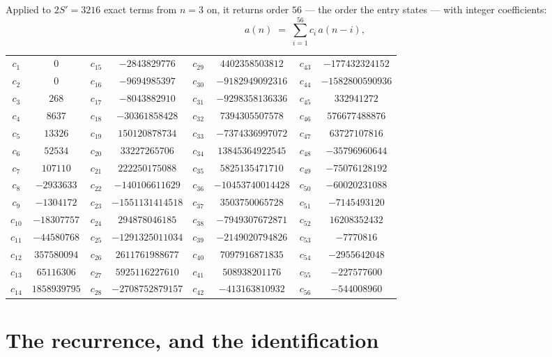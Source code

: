 \documentclass[11pt,a4paper]{article}
\theoremstyle{plain}
\theoremstyle{definition}
\begin{document}
Applied to $2S'=3216$ exact terms from $n=3$ on, it returns order $56$ --- the
order the entry states --- with integer coefficients:
\[
a(n)\;=\;\sum_{i=1}^{56}c_i\,a(n-i),
\]
\begin{center}\small
\begin{tabular}{cccccccc}
$c_{1}$ & $0$ & $c_{15}$ & $-2843829776$ & $c_{29}$ & $4402358503812$ & $c_{43}$ & $-177432324152$ \\
$c_{2}$ & $0$ & $c_{16}$ & $-9694985397$ & $c_{30}$ & $-9182949092316$ & $c_{44}$ & $-1582800590936$ \\
$c_{3}$ & $268$ & $c_{17}$ & $-8043882910$ & $c_{31}$ & $-9298358136336$ & $c_{45}$ & $332941272$ \\
$c_{4}$ & $8637$ & $c_{18}$ & $-30361858428$ & $c_{32}$ & $7394305507578$ & $c_{46}$ & $576677488876$ \\
$c_{5}$ & $13326$ & $c_{19}$ & $150120878734$ & $c_{33}$ & $-7374336997072$ & $c_{47}$ & $63727107816$ \\
$c_{6}$ & $52534$ & $c_{20}$ & $33227265706$ & $c_{34}$ & $13845364922545$ & $c_{48}$ & $-35796960644$ \\
$c_{7}$ & $107110$ & $c_{21}$ & $222250175088$ & $c_{35}$ & $5825135471710$ & $c_{49}$ & $-75076128192$ \\
$c_{8}$ & $-2933633$ & $c_{22}$ & $-140106611629$ & $c_{36}$ & $-10453740014428$ & $c_{50}$ & $-60020231088$ \\
$c_{9}$ & $-1304172$ & $c_{23}$ & $-1551131414518$ & $c_{37}$ & $3503750065728$ & $c_{51}$ & $-7145493120$ \\
$c_{10}$ & $-18307757$ & $c_{24}$ & $294878046185$ & $c_{38}$ & $-7949307672871$ & $c_{52}$ & $16208352432$ \\
$c_{11}$ & $-44580768$ & $c_{25}$ & $-1291325011034$ & $c_{39}$ & $-2149020794826$ & $c_{53}$ & $-7770816$ \\
$c_{12}$ & $357580094$ & $c_{26}$ & $2611761988677$ & $c_{40}$ & $7097916871835$ & $c_{54}$ & $-2955642048$ \\
$c_{13}$ & $65116306$ & $c_{27}$ & $5925116227610$ & $c_{41}$ & $508938201176$ & $c_{55}$ & $-227577600$ \\
$c_{14}$ & $1858939795$ & $c_{28}$ & $-2708752879157$ & $c_{42}$ & $-413163810932$ & $c_{56}$ & $-544008960$ \\
\end{tabular}
\end{center}

\section{The recurrence, and the identification}
\end{document}
